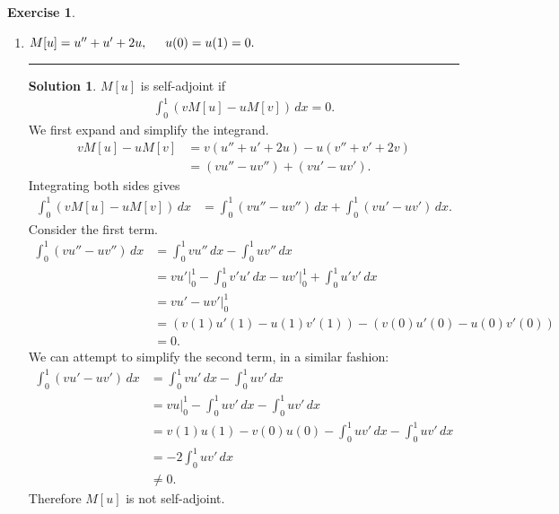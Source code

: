 \documentclass{article}
\theoremstyle{definition}
\newtheorem*{exer*}{Exercise}
\newtheorem*{sln*}{Solution}
\begin{document}
\begin{exer*}
	\begin{enumerate}
		\item $M[u] = u''+ u' + 2u,\hspace{0.5cm} u(0) = u(1) = 0.$\\
			\noindent\rule{\textwidth}{0.5pt}
		\begin{sln*}
			$M[u]$ is self-adjoint if
			\begin{align*}
			\int^1_0 (vM[u] - uM[v])\,dx = 0.
			\end{align*}
			We first expand and simplify the integrand.
			\begin{align*}
			vM[u] - uM[v] &= v( u''+ u' + 2u) - u( v''+ v' + 2v)\\
			&= (vu'' - uv'') + (vu' - uv').
			\end{align*}
			Integrating both sides gives
			\begin{align*}
			\int^1_0 (vM[u] - uM[v])\,dx &= \int^1_0 (vu'' - uv'')\,dx + \int^1_0 (vu' - uv')\,dx.
			\end{align*} 
			Consider the first term.
			\begin{align*}
			\int^1_0 (vu'' - uv'')\,dx &= \int^1_0 vu''\,dx - \int^1_0 uv''\,dx\\
			&= vu'\bigg\vert^1_0 - \int^1_0 v'u'\,dx - uv'\bigg\vert^1_0 +  \int^1_0 u'v'\,dx\\
			&= vu' - uv' \bigg\vert^1_0\\
			&= (v(1)u'(1) - u(1)v'(1)) - (v(0)u'(0) - u(0)v'(0))\\
			&= 0. 
			\end{align*}
			We can attempt to simplify the second term, in a similar fashion:
			\begin{align*}
			\int^1_0 (vu' - uv')\,dx &= \int^1_0 vu'\,dx - \int^1_0   uv'\,dx\\
			&= vu\bigg\vert^1_0 - \int^1_0   uv'\,dx - \int^1_0   uv'\,dx\\
			&= v(1)u(1) - v(0)u(0) - \int^1_0   uv'\,dx - \int^1_0   uv'\,dx\\
			&= -2\int^1_0   uv'\,dx\\
			&\neq 0.
			\end{align*} 
			Therefore $M[u]$ is not self-adjoint. 
		\end{sln*}
		\newpage
		
		
		
		
		

\end{enumerate}
\end{exer*}
\end{document}
